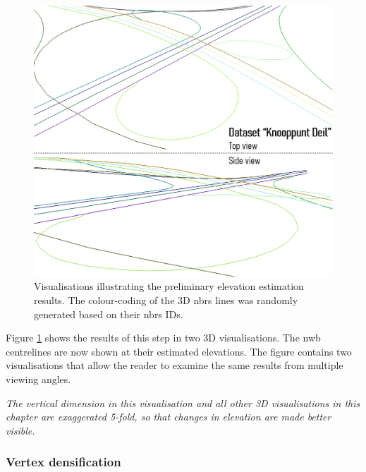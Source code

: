 \begin{figure}
    \centering
    \includegraphics[width=\linewidth]{final_report/figs/elevationestimation0.png}
    \caption[Visualisations illustrating the preliminary elevation estimation results]{Visualisations illustrating the preliminary elevation estimation results. The colour-coding of the 3D \ac{nbrs} lines was randomly generated based on their \ac{nbrs} IDs.}
    \label{fig:elevationestimation0}
\end{figure}

Figure \ref{fig:elevationestimation0} shows the results of this step in two 3D visualisations. The \ac{nwb} centrelines are now shown at their estimated elevations. The figure contains two visualisations that allow the reader to examine the same results from multiple viewing angles. 

\textit{The vertical dimension in this visualisation and all other 3D visualisations in this chapter are exaggerated 5-fold, so that changes in elevation are made better visible.}

\subsubsection{Vertex densification}

